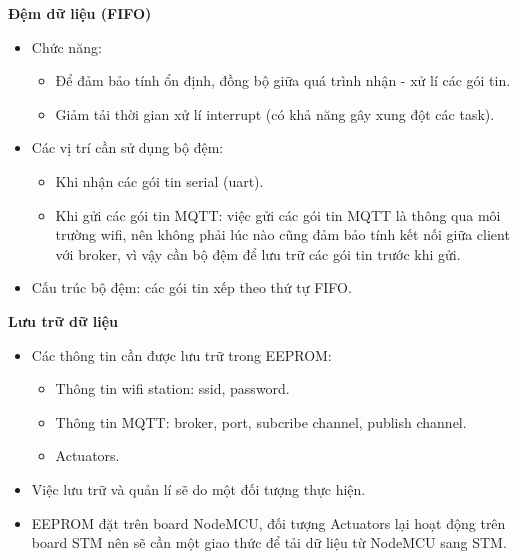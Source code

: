 \documentclass[a4paper,12pt,oneside]{article}
\begin{document}
\noindent	\textbf{Đệm dữ liệu (FIFO)}
	\begin{itemize}
	\item Chức năng:
		\begin{itemize}
		\item	Để đảm bảo tính ổn định, đồng bộ giữa quá trình nhận - xử lí các gói tin.
		\item	Giảm tải thời gian xử lí interrupt (có khả năng gây xung đột các task).
		\end{itemize}
	\item	Các vị trí cần sử dụng bộ đệm:
		\begin{itemize}
		\item	Khi  nhận các gói tin serial (uart).
		\item	Khi gửi các gói tin MQTT: việc gửi các gói tin MQTT là thông qua môi trường wifi, nên không phải lúc nào cũng đảm bảo tính kết nối giữa client với broker, vì vậy cần bộ đệm để lưu trữ các gói tin trước khi gửi.
		\end{itemize}
	\item	Cấu trúc bộ đệm: các gói tin xếp theo thứ tự FIFO.
	\end{itemize}


\noindent	\textbf{Lưu trữ dữ liệu}
	\begin{itemize}
	\item	Các thông tin cần được lưu trữ trong EEPROM:
		\begin{itemize}
		\item	Thông tin wifi station: ssid, password.
		\item	Thông tin MQTT: broker, port, subcribe channel, publish channel.
		\item	Actuators.
		\end{itemize}
	\item	Việc lưu trữ và quản lí sẽ do một đối tượng thực hiện.
	
	\item	EEPROM đặt trên board NodeMCU, đối tượng Actuators lại hoạt động trên board STM nên sẽ cần một giao thức để tải dữ liệu từ NodeMCU sang STM. 

	\end{itemize}
\end{document}

